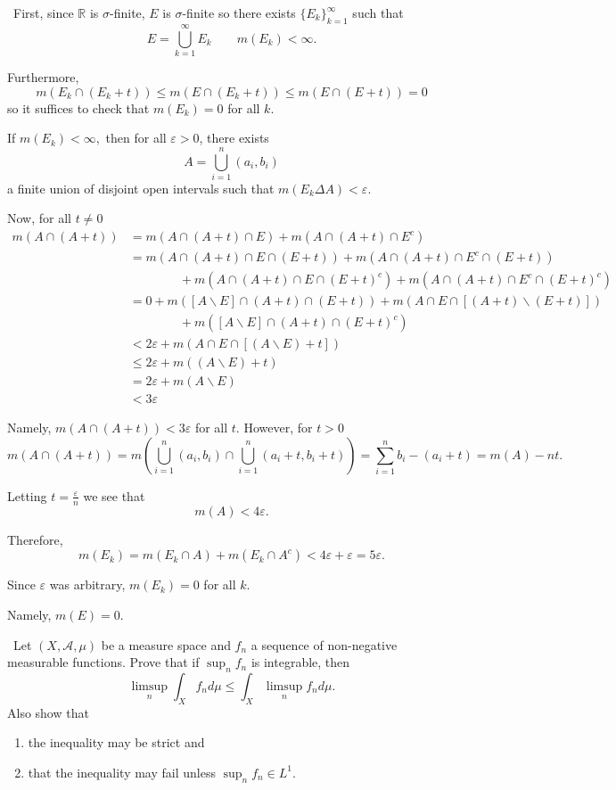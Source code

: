 \documentclass[12pt]{Qual}
\begin{document}
\begin{solution}$\,$
First, since $\mathbb{R}$ is $\sigma$-finite, $E$ is $\sigma$-finite so there exists $\{E_k\}_{k=1}^\infty$ such that $$E=\bigcup_{k=1}^\infty E_k\qquad m(E_k)<\infty.$$

Furthermore, $$m(E_k\cap (E_k+t))\le m(E\cap (E_k+t))\le m(E\cap (E+t))=0$$ so it suffices to check that $m(E_k)=0$ for all $k.$

If $m(E_k)<\infty,$ then for all $\varepsilon>0$, there exists $$A=\bigcup_{i=1}^n(a_i,b_i)$$ a finite union of disjoint open intervals such that $m(E_k\Delta A)<\varepsilon.$

Now, for all $t\not=0$ \begin{align*}
    m(A\cap(A+t))&=m(A\cap (A+t)\cap E)+m(A\cap( A+t)\cap E^c)\\
    &=m(A\cap (A+t)\cap E\cap (E+t))+m(A\cap( A+t)\cap E^c\cap (E+t))\\
    &\qquad\qquad +m(A\cap (A+t)\cap E\cap(E+t)^c)+m(A\cap( A+t)\cap E^c\cap(E+t)^c)\\
    &=0+m([A\backslash E]\cap (A+t)\cap (E+t))+m(A\cap E\cap [(A+t)\backslash(E+t)])\\
    &\qquad\qquad+m([A\backslash E]\cap(A+t)\cap (E+t)^c)\\
    &<2\varepsilon+m(A\cap E\cap [(A\backslash E)+t])\\
    &\le 2\varepsilon+m((A\backslash E)+t)\\
    &=2\varepsilon+m(A\backslash E)\\
    &<3\varepsilon
\end{align*}

Namely, $m(A\cap (A+t))<3\varepsilon$ for all $t.$ However, for $t>0$ $$m(A\cap (A+t))=m\left(\bigcup_{i=1}^n(a_i,b_i)\cap\bigcup_{i=1}^n(a_i+t,b_i+t)\right)=\sum_{i=1}^nb_i-(a_i+t)=m(A)-nt.$$

Letting $t=\frac{\varepsilon}{n}$ we see that $$m(A)<4\varepsilon.$$

Therefore, $$m(E_k)=m(E_k\cap A)+m(E_k\cap A^c)<4\varepsilon+\varepsilon=5\varepsilon.$$

Since $\varepsilon$ was arbitrary, $m(E_k)=0$ for all $k.$

Namely, $m(E)=0.$
\end{solution}
\newpage



\begin{problem} $\,$
Let $(X,\mathscr{A},\mu)$ be a measure space and $f_n$ a sequence of non-negative measurable functions. Prove that if $\sup_nf_n$ is integrable, then $$\limsup_n\int_Xf_nd\mu\le\int_X\limsup_nf_nd\mu.$$ Also show that \begin{enumerate}[label=(\alph*)]
    \item the inequality may be strict and
    \item that the inequality may fail unless $\sup_nf_n\in L^1.$
\end{enumerate}
\end{problem}
\end{document}
